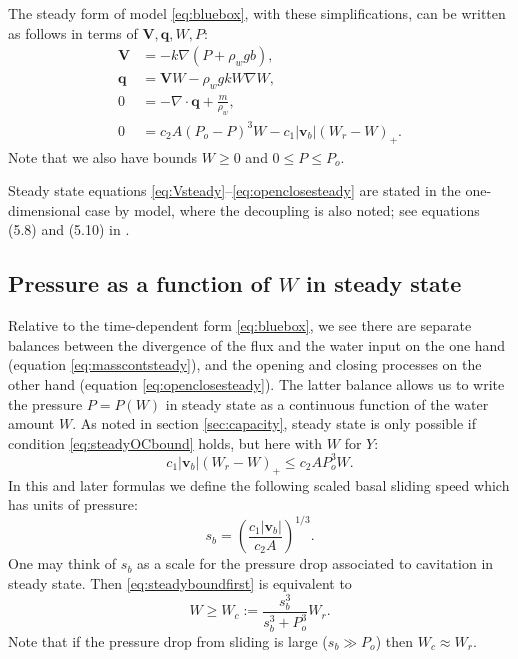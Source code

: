 \documentclass[gmd]{copernicus}   %
\newcommand\bv{\mathbf{v}}
\newcommand\bV{\mathbf{V}}
\newcommand\bq{\mathbf{q}}
\newcommand{\Div}{\nabla\cdot}
\newcommand{\grad}{\nabla}
\begin{document}
The steady form of model \eqref{eq:bluebox}, with these simplifications, can be written as follows in terms of $\bV,\bq,W,P$:
\begin{align}
\bV &= - k \grad \left(P + \rho_w g b\right), \label{eq:Vsteady} \\
\bq &= \bV W - \rho_w g k W \grad W, \label{eq:qsteady} \\
0 &= - \Div \bq + \frac{m}{\rho_w}, \label{eq:masscontsteady} \\
0 &= c_2 A (P_o - P)^3 W - c_1 |\bv_b| (W_r - W)_+. \label{eq:openclosesteady}
\end{align}
Note that we also have bounds $W\ge 0$ and $0 \le P \le P_o$.

Steady state equations \eqref{eq:Vsteady}--\eqref{eq:openclosesteady} are stated in the one-dimensional case by \cite{Schoofetal2012} model, where the decoupling is also noted; see equations (5.8) and (5.10) in \citep{Schoofetal2012}.

\subsection{Pressure as a function of $W$ in steady state}  Relative to the time-dependent form \eqref{eq:bluebox}, we see there are separate balances between the divergence of the flux and the water input on the one hand (equation \eqref{eq:masscontsteady}), and the opening and closing processes on the other hand (equation \eqref{eq:openclosesteady}).  The latter balance allows us to write the pressure $P=P(W)$ in steady state as a continuous function of the water amount $W$.  As noted in section \ref{sec:capacity}, steady state is only possible if condition \eqref{eq:steadyOCbound} holds, but here with $W$ for $Y$:
\begin{equation}
c_1 |\bv_b| (W_r - W)_+ \le c_2 A P_o^3 W. \label{eq:steadyboundfirst}
\end{equation}
In this and later formulas we define the following scaled basal sliding speed which has units of pressure:
\begin{equation}
s_b =  \left(\frac{c_1 |\bv_b|}{c_2 A}\right)^{1/3}.  \label{eq:definesb}
\end{equation}
One may think of $s_b$ as a scale for the pressure drop associated to cavitation in steady state.  Then \eqref{eq:steadyboundfirst} is equivalent to
\begin{equation}
W \ge W_c := \frac{s_b^3}{s_b^3 + P_o^3} W_r. \label{eq:steadyboundsecond}
\end{equation}
Note that if the pressure drop from sliding is large ($s_b \gg P_o$) then $W_c\approx W_r$.
\end{document}
